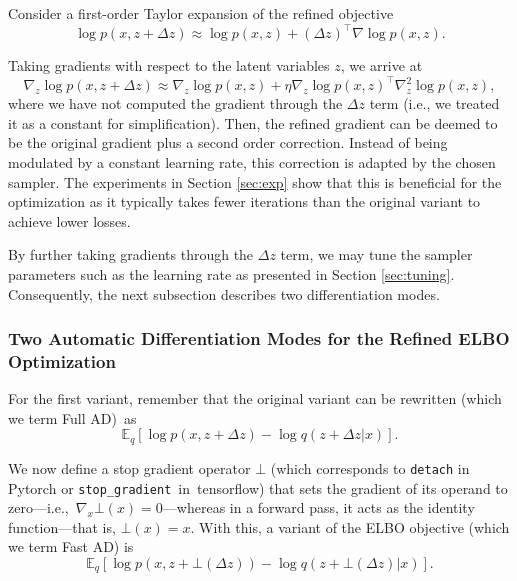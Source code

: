 Consider a first-order Taylor expansion of the refined objective 
$$
\log p(x, z + \Delta z) \approx \log p(x, z) + (\Delta z)^\intercal \nabla \log p(x, z).
$$

Taking gradients %
with respect to the latent variables $z$, we arrive at
$$
\nabla_z \log p(x, z + \Delta z) \approx \nabla_z \log p(x,z) + \eta \nabla_z \log p(x,z)^\intercal \nabla_z^2 \log p(x,z),
$$
where we have not computed the gradient through the $\Delta z$ term (i.e., we treated it as a constant for simplification). Then, the refined gradient can be deemed to be the original gradient plus a second order correction. Instead of being modulated by a constant learning rate, this correction is adapted by the chosen sampler. The experiments in Section \ref{sec:exp} 
show that this is beneficial for the optimization as it 
typically takes fewer iterations than the original variant to achieve lower losses. 

By further taking gradients through the $\Delta z$ term, we may tune the sampler parameters such as the learning rate as 
presented in Section \ref{sec:tuning}. Consequently, the next subsection describes two 
differentiation modes.


\subsubsection*{Two Automatic Differentiation Modes for the Refined ELBO Optimization}\label{sec:AD}

For the first variant, 
remember that the original variant can be 
rewritten (which we term Full AD)~as
\begin{equation}
     \mathbb{E}_q \left[ \log p(x, z + \Delta z) - \log q(z + \Delta z | x) \right].
\end{equation}



We now define a stop gradient operator $\bot$ (which corresponds to \texttt{detach} in Pytorch or \linebreak \texttt{stop\_gradient}~in~tensorflow)  that sets the gradient of its operand to zero---i.e.,~$\nabla_x \bot (x) = 0$---whereas in a forward pass, it acts as the identity function---that is, $\bot (x) = x$. With this, a variant  of the ELBO objective (which we term Fast AD) is
\begin{equation}
    \mathbb{E}_q \left[ \log p(x, z + \bot (\Delta z)) - \log q(z + \bot(\Delta z) | x) \right].
\end{equation}

